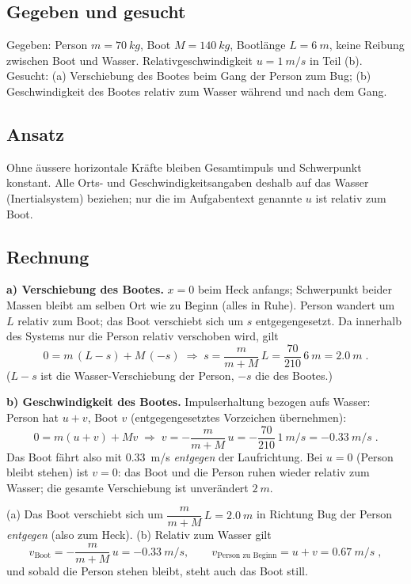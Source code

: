 
\subsection*{Gegeben und gesucht}
Gegeben: Person $m=\qty{70}{kg}$, Boot $M=\qty{140}{kg}$, Bootlänge
$L=\qty{6}{m}$, keine Reibung zwischen Boot und Wasser. Relativgeschwindigkeit
$u=\qty{1}{m/s}$ in Teil (b).
Gesucht: (a) Verschiebung des Bootes beim Gang der Person zum Bug; (b)
Geschwindigkeit des Bootes relativ zum Wasser während und nach dem Gang.

\subsection*{Ansatz}
Ohne äussere horizontale Kräfte bleiben Gesamtimpuls und Schwerpunkt konstant.
Alle Orts- und Geschwindigkeitsangaben deshalb auf das Wasser (Inertialsystem)
beziehen; nur die im Aufgabentext genannte $u$ ist relativ zum Boot.

\subsection*{Rechnung}
\textbf{a) Verschiebung des Bootes.} $x=0$ beim Heck anfangs; Schwerpunkt beider
Massen bleibt am selben Ort wie zu Beginn (alles in Ruhe). Person wandert um
$L$ relativ zum Boot; das Boot verschiebt sich um $s$ entgegengesetzt. Da
innerhalb des Systems nur die Person relativ verschoben wird, gilt
\begin{equation}
  0 = m\,(L-s) + M\,(-s)
  \;\Rightarrow\;
  s = \frac{m}{m+M}\,L
  = \frac{70}{210}\,\qty{6}{m}
  = \qty{2.0}{m}\;.
\end{equation}
($L-s$ ist die Wasser-Verschiebung der Person, $-s$ die des Bootes.)

\textbf{b) Geschwindigkeit des Bootes.} Impulserhaltung bezogen aufs Wasser:
Person hat $u+v$, Boot $v$ (entgegengesetztes Vorzeichen übernehmen):
\begin{equation}
  0 = m(u+v) + Mv
  \;\Rightarrow\;
  v = -\frac{m}{m+M}\,u
  = -\frac{70}{210}\,\qty{1}{m/s}
  = \qty{-0.33}{m/s}\;.
\end{equation}
Das Boot fährt also mit \qty{0.33}{m/s} \emph{entgegen} der Laufrichtung. Bei
$u=0$ (Person bleibt stehen) ist $v=0$: das Boot und die Person ruhen wieder
relativ zum Wasser; die gesamte Verschiebung ist unverändert
$\qty{2}{m}$.

\begin{ergebnis}
(a) Das Boot verschiebt sich um $\dfrac{m}{m+M}\,L=\qty{2.0}{m}$ in Richtung
Bug der Person \emph{entgegen} (also zum Heck). (b) Relativ zum Wasser gilt
\begin{equation*}
  v_\mathrm{Boot}=-\dfrac{m}{m+M}\,u=\qty{-0.33}{m/s},\qquad
  v_\mathrm{Person \text{ zu Beginn}}=u+v=\qty{0.67}{m/s}\;,
\end{equation*}
und sobald die Person stehen bleibt, steht auch das Boot still.
\end{ergebnis}

